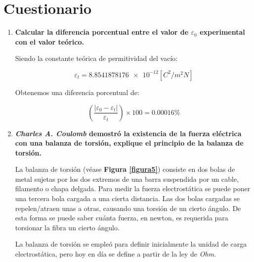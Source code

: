 \documentclass[letter,11pt]{article}
\begin{document}
\section{Cuestionario}

\begin{enumerate}
\item \textbf{Calcular la diferencia porcentual entre el valor de
$\varepsilon_0$ experimental con el valor teórico.}

Siendo la constante teórica de permitividad del vacío:

\begin{equation*}
    \varepsilon_t = \num{8.8541878176e-12} [C^2/m^2 N]
\end{equation*}

Obtenemos una diferencia porcentual de:

\begin{equation}
    \left(\frac{|\varepsilon_0 - \varepsilon_t|}{\varepsilon_t}\right) \times 100 = 0.00016 \%
\end{equation}

\item \textbf{\emph{Charles A. Coulomb} demostró la existencia de la fuerza
eléctrica con una balanza de torsión, explique el principio de la balanza de
torsión.}

La balanza de torsión (véase \textbf{Figura \ref{figura5}}) consiste en dos
bolas de metal sujetas por los dos extremos de una barra suspendida por un
cable, filamento o chapa delgada. Para medir la fuerza electrostática se puede
poner una tercera bola cargada a una cierta distancia. Las dos bolas cargadas se
repelen/atraen unas a otras, causando una torsión de un cierto ángulo. De esta
forma se puede saber cuánta fuerza, en newton, es requerida para torsionar la
fibra un cierto ángulo.

La balanza de torsión se empleó para definir inicialmente la unidad de carga
electrostática, pero hoy en día se define a partir de la ley de \emph{Ohm}.


\end{enumerate}
\end{document}
